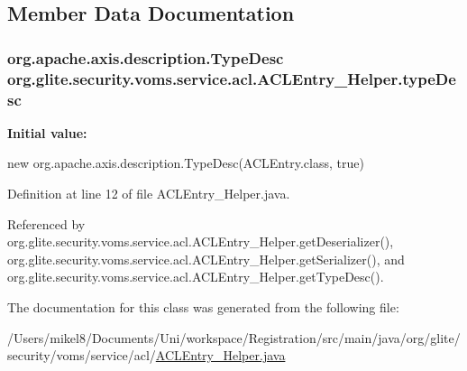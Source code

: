 \subsection{Member Data Documentation}
\hypertarget{classorg_1_1glite_1_1security_1_1voms_1_1service_1_1acl_1_1ACLEntry__Helper_ab8674c22678411d9692af37ad4c9b01f}{
\subsubsection[{typeDesc}]{\setlength{\rightskip}{0pt plus 5cm}org.apache.axis.description.TypeDesc {\bf org.glite.security.voms.service.acl.ACLEntry\_\-Helper.typeDesc}}}
\label{classorg_1_1glite_1_1security_1_1voms_1_1service_1_1acl_1_1ACLEntry__Helper_ab8674c22678411d9692af37ad4c9b01f}
{\bfseries Initial value:}
\begin{DoxyCode}

        new org.apache.axis.description.TypeDesc(ACLEntry.class, true)
\end{DoxyCode}


Definition at line 12 of file ACLEntry\_\-Helper.java.



Referenced by org.glite.security.voms.service.acl.ACLEntry\_\-Helper.getDeserializer(), org.glite.security.voms.service.acl.ACLEntry\_\-Helper.getSerializer(), and org.glite.security.voms.service.acl.ACLEntry\_\-Helper.getTypeDesc().



The documentation for this class was generated from the following file:\begin{DoxyCompactItemize}
\item 
/Users/mikel8/Documents/Uni/workspace/Registration/src/main/java/org/glite/security/voms/service/acl/\hyperlink{service_2acl_2ACLEntry__Helper_8java}{ACLEntry\_\-Helper.java}\end{DoxyCompactItemize}
